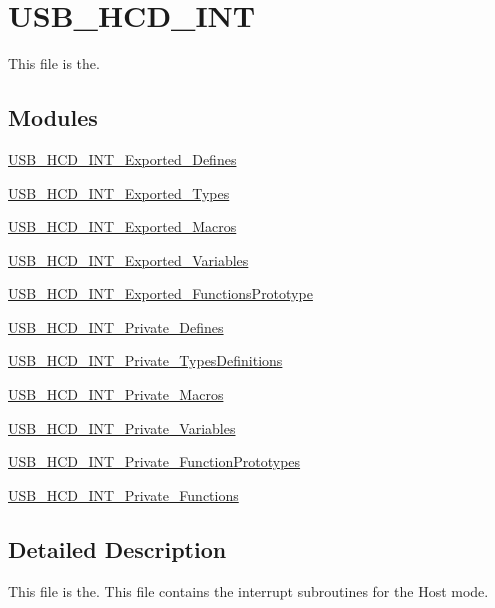\hypertarget{group___u_s_b___h_c_d___i_n_t}{\section{U\-S\-B\-\_\-\-H\-C\-D\-\_\-\-I\-N\-T}
\label{group___u_s_b___h_c_d___i_n_t}
}


This file is the.  


\subsection*{Modules}
\begin{DoxyCompactItemize}
\item 
\hyperlink{group___u_s_b___h_c_d___i_n_t___exported___defines}{U\-S\-B\-\_\-\-H\-C\-D\-\_\-\-I\-N\-T\-\_\-\-Exported\-\_\-\-Defines}
\item 
\hyperlink{group___u_s_b___h_c_d___i_n_t___exported___types}{U\-S\-B\-\_\-\-H\-C\-D\-\_\-\-I\-N\-T\-\_\-\-Exported\-\_\-\-Types}
\item 
\hyperlink{group___u_s_b___h_c_d___i_n_t___exported___macros}{U\-S\-B\-\_\-\-H\-C\-D\-\_\-\-I\-N\-T\-\_\-\-Exported\-\_\-\-Macros}
\item 
\hyperlink{group___u_s_b___h_c_d___i_n_t___exported___variables}{U\-S\-B\-\_\-\-H\-C\-D\-\_\-\-I\-N\-T\-\_\-\-Exported\-\_\-\-Variables}
\item 
\hyperlink{group___u_s_b___h_c_d___i_n_t___exported___functions_prototype}{U\-S\-B\-\_\-\-H\-C\-D\-\_\-\-I\-N\-T\-\_\-\-Exported\-\_\-\-Functions\-Prototype}
\item 
\hyperlink{group___u_s_b___h_c_d___i_n_t___private___defines}{U\-S\-B\-\_\-\-H\-C\-D\-\_\-\-I\-N\-T\-\_\-\-Private\-\_\-\-Defines}
\item 
\hyperlink{group___u_s_b___h_c_d___i_n_t___private___types_definitions}{U\-S\-B\-\_\-\-H\-C\-D\-\_\-\-I\-N\-T\-\_\-\-Private\-\_\-\-Types\-Definitions}
\item 
\hyperlink{group___u_s_b___h_c_d___i_n_t___private___macros}{U\-S\-B\-\_\-\-H\-C\-D\-\_\-\-I\-N\-T\-\_\-\-Private\-\_\-\-Macros}
\item 
\hyperlink{group___u_s_b___h_c_d___i_n_t___private___variables}{U\-S\-B\-\_\-\-H\-C\-D\-\_\-\-I\-N\-T\-\_\-\-Private\-\_\-\-Variables}
\item 
\hyperlink{group___u_s_b___h_c_d___i_n_t___private___function_prototypes}{U\-S\-B\-\_\-\-H\-C\-D\-\_\-\-I\-N\-T\-\_\-\-Private\-\_\-\-Function\-Prototypes}
\item 
\hyperlink{group___u_s_b___h_c_d___i_n_t___private___functions}{U\-S\-B\-\_\-\-H\-C\-D\-\_\-\-I\-N\-T\-\_\-\-Private\-\_\-\-Functions}
\end{DoxyCompactItemize}


\subsection{Detailed Description}
This file is the. This file contains the interrupt subroutines for the Host mode.
